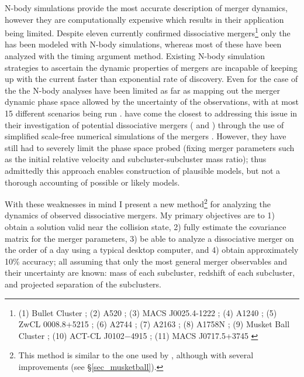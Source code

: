 \documentclass[12pt]{emulateapj}
\begin{document}
N-body simulations provide the most accurate description of merger dynamics, however they are computationally expensive which results in their application being limited.
Despite eleven currently confirmed dissociative mergers\footnote{(1) Bullet Cluster \citep{Clowe:2004eq}; 
(2) A520 \citep{Mahdavi:2007ed}; 
(3) MACS J0025.4-1222 \citep{Bradac:2008gw}; 
(4) A1240 \citep{Barrena:2009to}; 
(5) ZwCL 0008.8+5215 \citep{vanWeeren:2011ko}; 
(6) A2744 \citep{Merten:2011gu}; 
(7) A2163 \citep{Okabe:2011gv}; 
(8) A1758N \citep{Ragozzine:2011jj}; 
(9) Musket Ball Cluster \citep{Dawson:2012dl}; 
(10) ACT-CL J0102−4915 \citep{Menanteau:2012bf}; 
(11) MACS J0717.5+3745 \citep{Mroczkowski:2012vs}} only the  has been modeled with N-body simulations, whereas most of these have been analyzed with the timing argument method.
Existing N-body simulation strategies to ascertain the dynamic properties of mergers are incapable of keeping up with the current faster than exponential rate of discovery.
Even for the case of the  the N-body analyses have been limited as far as mapping out the merger dynamic phase space allowed by  the uncertainty of the observations, with at most 15 different scenarios being run \citep{Mastropietro:2008fs}.
\citet{Gomez:2012ex} have come the closest to addressing this issue in their investigation of potential dissociative mergers ( and ) through the use of simplified scale-free numerical simulations of the mergers \citep[see][for details]{Gomez:2000kj}.  
However, they have still had to severely limit the phase space probed (fixing merger parameters such as the initial relative velocity and subcluster-subcluster mass ratio); thus admittedly this approach enables construction of plausible models, but not a thorough accounting of possible or likely models.


With these weaknesses in mind I present a new method\footnote{This method is similar to the one used by \citet{Dawson:2012dl}, although with several improvements (see \S\ref{sec_musketball}).}  for analyzing the dynamics of observed dissociative mergers.
My primary objectives are to 1) obtain a solution valid near the collision state, 2) fully estimate the covariance matrix for the merger parameters, 3) be able to analyze a dissociative merger on the order of a day using a typical desktop computer, and 4) obtain approximately 10\% accuracy; all assuming that only the most general merger observables and their uncertainty are known: mass of each subcluster, redshift of each subcluster, and projected separation of the subclusters.
\end{document}
